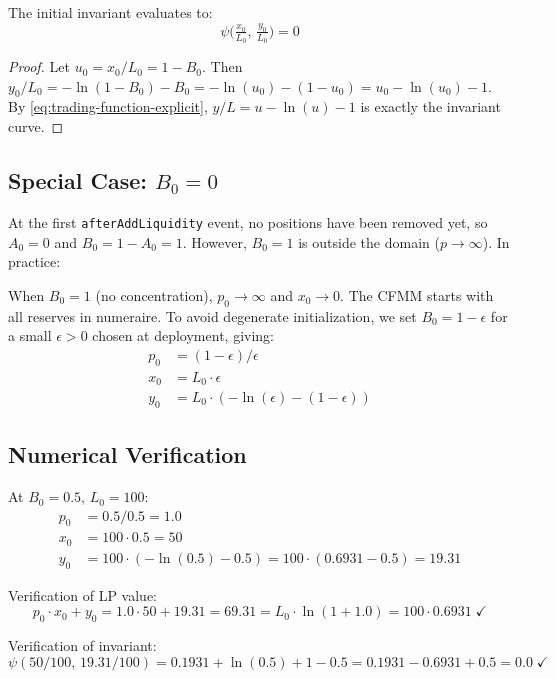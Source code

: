 \begin{proposition}\label{prop:init-invariant}
The initial invariant evaluates to:
\begin{equation}\label{eq:init-invariant}
  \psi\bigl(\tfrac{x_0}{L_0},\, \tfrac{y_0}{L_0}\bigr) = 0
\end{equation}
\end{proposition}

\begin{proof}
Let $u_0 = x_0/L_0 = 1 - B_0$. Then $y_0/L_0 = -\ln(1-B_0) - B_0 = -\ln(u_0) - (1 - u_0) = u_0 - \ln(u_0) - 1$.
By \eqref{eq:trading-function-explicit}, $y/L = u - \ln(u) - 1$ is exactly the invariant curve. \qedhere
\end{proof}

\subsection{Special Case: $B_0 = 0$}

At the first \texttt{afterAddLiquidity} event, no positions have been removed yet,
so $A_0 = 0$ and $B_0 = 1 - A_0 = 1$. However, $B_0 = 1$ is outside the domain
($p \to \infty$). In practice:

\begin{remark}\label{rem:genesis}
When $B_0 = 1$ (no concentration), $p_0 \to \infty$ and $x_0 \to 0$.
The CFMM starts with all reserves in numeraire.
To avoid degenerate initialization, we set $B_0 = 1 - \epsilon$ for a small
$\epsilon > 0$ chosen at deployment, giving:
\begin{align}
  p_0 &= (1 - \epsilon) / \epsilon \\
  x_0 &= L_0 \cdot \epsilon \\
  y_0 &= L_0 \cdot (-\ln(\epsilon) - (1 - \epsilon))
\end{align}
\end{remark}

\subsection{Numerical Verification}

At $B_0 = 0.5$, $L_0 = 100$:
\begin{align*}
  p_0 &= 0.5 / 0.5 = 1.0 \\
  x_0 &= 100 \cdot 0.5 = 50 \\
  y_0 &= 100 \cdot (-\ln(0.5) - 0.5) = 100 \cdot (0.6931 - 0.5) = 19.31
\end{align*}

Verification of LP value:
\[
  p_0 \cdot x_0 + y_0 = 1.0 \cdot 50 + 19.31 = 69.31 = L_0 \cdot \ln(1 + 1.0) = 100 \cdot 0.6931 \;\checkmark
\]

Verification of invariant:
\[
  \psi(50/100,\, 19.31/100) = 0.1931 + \ln(0.5) + 1 - 0.5 = 0.1931 - 0.6931 + 0.5 = 0.0 \;\checkmark
\]
